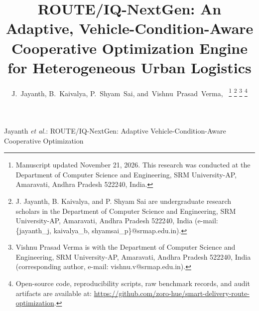 \documentclass[journal,10pt]{IEEEtran}
\begin{document}
\title{ROUTE/IQ-NextGen: An Adaptive, Vehicle-Condition-Aware Cooperative Optimization Engine for Heterogeneous Urban Logistics}

\author{J.~Jayanth, 
        B.~Kaivalya, 
        P.~Shyam~Sai, 
        and~Vishnu~Prasad~Verma,~%
\thanks{Manuscript updated November 21, 2026. This research was conducted at the Department of Computer Science and Engineering, SRM University-AP, Amaravati, Andhra Pradesh 522240, India.}%
\thanks{J. Jayanth, B. Kaivalya, and P. Shyam Sai are undergraduate research scholars in the Department of Computer Science and Engineering, SRM University-AP, Amaravati, Andhra Pradesh 522240, India (e-mail: \{jayanth\_j, kaivalya\_b, shyamsai\_p\}@srmap.edu.in).}%
\thanks{Vishnu Prasad Verma is with the Department of Computer Science and Engineering, SRM University-AP, Amaravati, Andhra Pradesh 522240, India (corresponding author, e-mail: vishnu.v@srmap.edu.in).}%
\thanks{Open-source code, reproducibility scripts, raw benchmark records, and audit artifacts are available at: \url{https://github.com/zoro-hue/smart-delivery-route-optimization}.}}

%
{Jayanth \MakeLowercase{\textit{et al.}}: ROUTE/IQ-NextGen: Adaptive Vehicle-Condition-Aware Cooperative Optimization}

\maketitle
\end{document}
